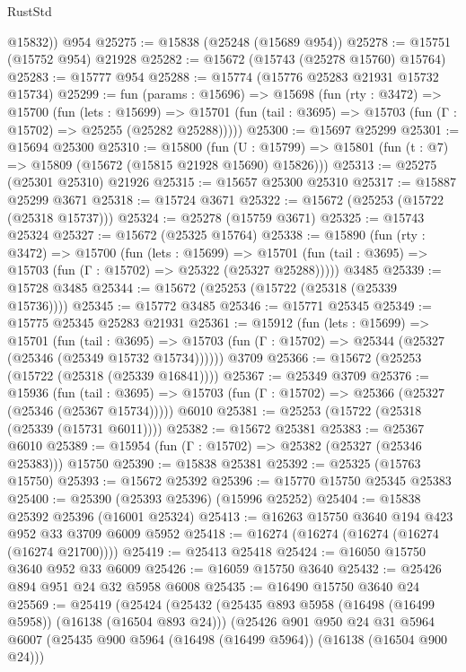 \begin{lexlean}{RustStd}
\begin{coremodule}
        @15832))
    @954
@25275 := @15838 (@25248 (@15689 @954))
@25278 := @15751 (@15752 @954) @21928
@25282 := @15672 (@15743 (@25278 @15760) @15764)
@25283 := @15777 @954
@25288 := @15774 (@15776 @25283 @21931 @15732 @15734)
@25299 := fun (params : @15696) =>
  @15698
    (fun (rty : @3472) =>
    @15700
      (fun (lets : @15699) =>
      @15701 (fun (tail : @3695) => @15703 (fun (Γ : @15702) => @25255 (@25282 @25288)))))
@25300 := @15697 @25299
@25301 := @15694 @25300
@25310 := @15800
    (fun (U : @15799) => @15801 (fun (t : @7) => @15809 (@15672 (@15815 @21928 @15690) @15826)))
@25313 := @25275 (@25301 @25310) @21926
@25315 := @15657 @25300 @25310
@25317 := @15887 @25299 @3671
@25318 := @15724 @3671
@25322 := @15672 (@25253 (@15722 (@25318 @15737)))
@25324 := @25278 (@15759 @3671)
@25325 := @15743 @25324
@25327 := @15672 (@25325 @15764)
@25338 := @15890
    (fun (rty : @3472) =>
    @15700
      (fun (lets : @15699) =>
      @15701 (fun (tail : @3695) => @15703 (fun (Γ : @15702) => @25322 (@25327 @25288)))))
    @3485
@25339 := @15728 @3485
@25344 := @15672 (@25253 (@15722 (@25318 (@25339 @15736))))
@25345 := @15772 @3485
@25346 := @15771 @25345
@25349 := @15775 @25345 @25283 @21931
@25361 := @15912
    (fun (lets : @15699) =>
    @15701
      (fun (tail : @3695) =>
      @15703 (fun (Γ : @15702) => @25344 (@25327 (@25346 (@25349 @15732 @15734))))))
    @3709
@25366 := @15672 (@25253 (@15722 (@25318 (@25339 @16841))))
@25367 := @25349 @3709
@25376 := @15936
    (fun (tail : @3695) => @15703 (fun (Γ : @15702) => @25366 (@25327 (@25346 (@25367 @15734)))))
    @6010
@25381 := @25253 (@15722 (@25318 (@25339 (@15731 @6011))))
@25382 := @15672 @25381
@25383 := @25367 @6010
@25389 := @15954 (fun (Γ : @15702) => @25382 (@25327 (@25346 @25383))) @15750
@25390 := @15838 @25381
@25392 := @25325 (@15763 @15750)
@25393 := @15672 @25392
@25396 := @15770 @15750 @25345 @25383
@25400 := @25390 (@25393 @25396) (@15996 @25252)
@25404 := @15838 @25392 @25396 (@16001 @25324)
@25413 := @16263 @15750 @3640 @194 @423 @952 @33 @3709 @6009 @5952
@25418 := @16274 (@16274 (@16274 (@16274 (@16274 @21700))))
@25419 := @25413 @25418
@25424 := @16050 @15750 @3640 @952 @33 @6009
@25426 := @16059 @15750 @3640
@25432 := @25426 @894 @951 @24 @32 @5958 @6008
@25435 := @16490 @15750 @3640 @24
@25569 := @25419
    (@25424
      (@25432
        (@25435 @893 @5958 (@16498 (@16499 @5958)) (@16138 (@16504 @893 @24)))
        (@25426
          @901
          @950
          @24
          @31
          @5964
          @6007
          (@25435 @900 @5964 (@16498 (@16499 @5964)) (@16138 (@16504 @900 @24)))

\end{coremodule}
\end{lexlean}
